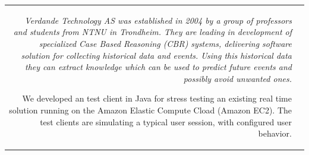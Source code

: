 \documentclass[a4paper,10pt]{article}
\begin{document}
\begin{longtable}{r|p{11cm}}
\footnotesize{\textit{Verdande Technology AS was established in 2004
    by a group of professors and students from NTNU in Trondheim. They are leading in development of specialized Case Based Reasoning (CBR) systems, delivering software solution for collecting historical data and events. Using this historical data they can extract knowledge which can be used to predict future events and possibly avoid unwanted ones.}
\newline

We developed an test client in Java for stress testing an existing real time solution running on the Amazon Elastic Compute Cload (Amazon EC2). The test clients are simulating a typical user session, with configured user behavior.
  \newline

} \\
\end{longtable}
\end{document}
